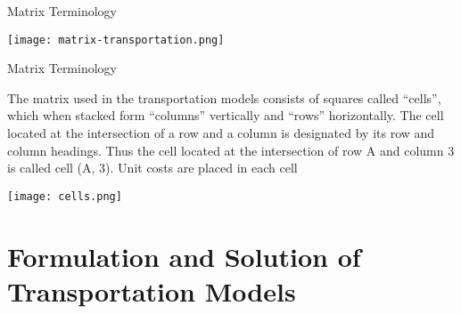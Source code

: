 \documentclass[../main.tex]{subfiles}
\begin{document}
\begin{frame}{Matrix Terminology}
  
  {\centering
  \texttt{[image: matrix-transportation.png]}
  \par}
\end{frame}

\begin{frame}{Matrix Terminology}

     The matrix used in the transportation models consists of squares called ``cells'', which when stacked form ``columns'' vertically and ``rows'' horizontally. The cell located at the intersection of a row and a column is designated by its row and column headings. Thus the cell located at the intersection of row A and column 3 is called cell (A, 3). Unit costs are placed in each cell

  {\centering \texttt{[image: cells.png]}\par}
\end{frame}

\section{Formulation and Solution of Transportation Models}
\label{sec:formulation-solution}
\end{document}
